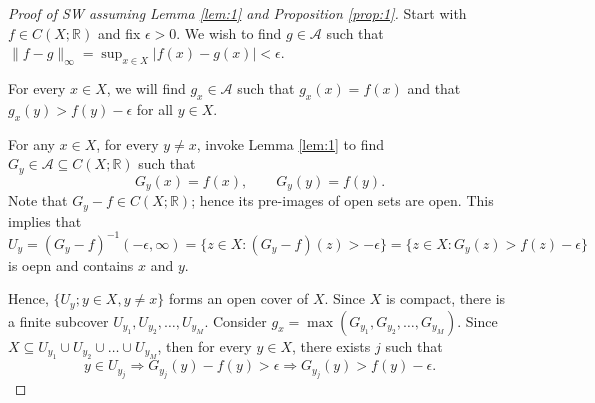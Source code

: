 \documentclass[letterpaper, reqno,11pt]{article}
\newcommand{\RR}{\mathbb{R}}
\begin{document}
\begin{proof}[Proof of SW assuming Lemma \ref{lem:1} and Proposition \ref{prop:1}]
  \renewcommand{\qedsymbol}{}
  Start with $f \in C(X; \RR)$ and fix $\epsilon > 0$. We wish to find $g \in \mathcal A$ such that $\lVert f - g \rVert_\infty = \sup_{x \in X} |f(x) - g(x)| < \epsilon$.

   For every $x \in X$, we will find $g_x \in \mathcal A$ such that $g_x(x) = f(x)$ and that $g_x(y) > f(y) - \epsilon$ for all $y \in X$.

  \begin{figure}[H]
    \centering
  \end{figure}

   For any $x \in X$, for every $y \neq x$, invoke Lemma \ref{lem:1} to find $G_y \in \mathcal A \subseteq C(X; \RR)$ such that
  \begin{equation} \label{eq:star} \tag{*}
    G_y(x) = f(x), \qquad G_y(y) = f(y).
  \end{equation}
  Note that $G_y - f \in C(X; \RR)$; hence its pre-images of open sets are open. This implies that
  $$ U_y = (G_y - f)^{-1} (-\epsilon, \infty) = \{ z \in X : (G_y - f)(z) > -\epsilon \} = \{ z \in X : G_y(z) > f(z) - \epsilon \} $$
  is oepn and contains $x$ and $y$.

  Hence, $\{ U_y ; y \in X, y \neq x \}$ forms an open cover of $X$. Since $X$ is compact, there is a finite subcover $U_{y_1}, U_{y_2}, \ldots, U_{y_M}$. Consider $g_x = \max(G_{y_1}, G_{y_2}, \ldots, G_{y_M})$. Since $X \subseteq U_{y_1} \cup U_{y_2} \cup \ldots \cup U_{y_M}$, then for every $y \in X$, there exists $j$ such that
  $$ y \in U_{y_j} \Rightarrow G_{y_j}(y) - f(y) > \epsilon \Rightarrow G_{y_j}(y) > f(y) - \epsilon. $$


\end{proof}
\end{document}
